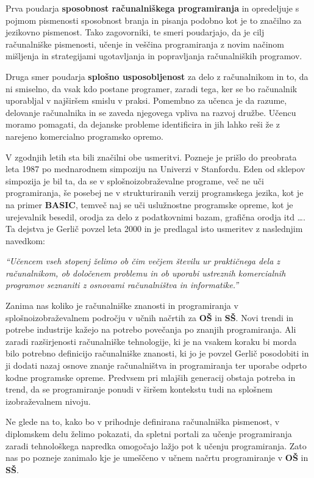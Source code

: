 Prva poudarja \textbf{sposobnost računalniškega programiranja} in
opredeljuje s pojmom pismenosti sposobnost branja in pisanja
podobno kot je to značilno za jezikovno pismenost. Tako zagovorniki,
te smeri poudarjajo, da je cilj računalniške pismenosti, učenje in
veščina programiranja z novim načinom mišljenja in strategijami
ugotavljanja in popravljanja računalniških programov.

Druga smer poudarja \textbf{splošno usposobljenost} za delo z
računalnikom in to, da ni smiselno, da vsak kdo postane programer,
zaradi tega, ker se bo računalnik uporabljal v najširšem smislu v
praksi. Pomembno za učenca je da razume, delovanje računalnika in se
zaveda njegovega vpliva na razvoj družbe. Učencu moramo pomagati, da
dejanske probleme identificira in jih lahko reši že z narejeno
komercialno programsko opremo.

V zgodnjih letih sta bili značilni obe usmeritvi. Pozneje je prišlo do
preobrata leta 1987 po mednarodnem simpoziju na Univerzi v
Stanfordu. Eden od sklepov simpozija je bil ta, da se v
splošnoizobraževalne programe, več ne uči programiranja, še posebej ne
v strukturiranih verzij programskega jezika, kot je na primer
\textbf{BASIC}, temveč naj se uči uslužnostne programske opreme, kot
je urejevalnik besedil, orodja za delo z podatkovnimi bazam, grafična
orodja itd \dots . Ta dejstva je Gerlič \cite{gerlic_2000} povzel leta
2000 in je predlagal isto usmeritev z naslednjim navedkom:

\emph{``Učencem vseh stopenj želimo ob
  čim večjem številu ur praktičnega dela z računalnikom, ob določenem
  problemu in ob uporabi ustreznih komercialnih programov seznaniti z
  osnovami računalništva in informatike.''}

Zanima nas koliko je računalniške znanosti in programiranja v
splošnoizobraževalnem področju v učnih načrtih za \textbf{OŠ} in
\textbf{SŠ}. Novi trendi in potrebe industrije kažejo na potrebo
povečanja po znanjih programiranja. Ali zaradi razširjenosti
računalniške tehnologije, ki je na vsakem koraku bi morda bilo
potrebno definicijo računalniške znanosti, ki jo je povzel Gerlič
posodobiti in ji dodati nazaj osnove znanje računalništva in
programiranja ter uporabe odprto kodne programske opreme. Predvsem pri
mlajših generacij obstaja potreba in trend, da se programiranje ponudi
v širšem kontekstu tudi na splošnem izobraževalnem nivoju.

Ne glede na to, kako bo v prihodnje definirana računalniška pismenost,
v diplomskem delu želimo pokazati, da spletni portali za
učenje programiranja zaradi tehnološkega napredka omogočajo lažjo pot
k učenju programiranja. Zato nas po pozneje zanimalo kje je umeščeno v
učnem načrtu programiranje v \textbf{OŠ} in \textbf{SŠ}.

